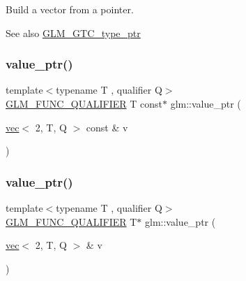 Build a vector from a pointer. \begin{DoxySeeAlso}{See also}
\hyperlink{group__gtc__type__ptr}{G\+L\+M\+\_\+\+G\+T\+C\+\_\+type\+\_\+ptr} 
\end{DoxySeeAlso}
\mbox{\label{group__gtc__type__ptr_gaa39964028a0cfbcd18549e33feea7357}} 
\subsubsection{\texorpdfstring{value\+\_\+ptr()}{value\_ptr()}\hspace{0.1cm}{\footnotesize\ttfamily [1/27]}}
{\footnotesize\ttfamily template$<$typename T , qualifier Q$>$ \\
\hyperlink{setup_8hpp_a33fdea6f91c5f834105f7415e2a64407}{G\+L\+M\+\_\+\+F\+U\+N\+C\+\_\+\+Q\+U\+A\+L\+I\+F\+I\+ER} T const$\ast$ glm\+::value\+\_\+ptr (\begin{DoxyParamCaption}\item[{\hyperlink{structglm_1_1vec}{vec}$<$ 2, T, Q $>$ const \&}]{v }\end{DoxyParamCaption})}

\mbox{\label{group__gtc__type__ptr_ga54d4e779df698b9d951378dc0de5149d}} 
\subsubsection{\texorpdfstring{value\+\_\+ptr()}{value\_ptr()}\hspace{0.1cm}{\footnotesize\ttfamily [2/27]}}
{\footnotesize\ttfamily template$<$typename T , qualifier Q$>$ \\
\hyperlink{setup_8hpp_a33fdea6f91c5f834105f7415e2a64407}{G\+L\+M\+\_\+\+F\+U\+N\+C\+\_\+\+Q\+U\+A\+L\+I\+F\+I\+ER} T$\ast$ glm\+::value\+\_\+ptr (\begin{DoxyParamCaption}\item[{\hyperlink{structglm_1_1vec}{vec}$<$ 2, T, Q $>$ \&}]{v }\end{DoxyParamCaption})}

